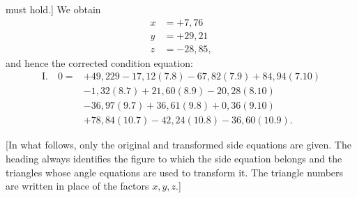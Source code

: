 must hold.] We obtain
\[
\begin{aligned}
x&=+7{,}76\\
y&=+29{,}21\\
z&=-28{,}85,
\end{aligned}
\]
and hence the corrected condition equation:
\[
\begin{aligned}
\mathrm{I.}\quad 0={}&+49{,}229-17{,}12(7.8)-67{,}82(7.9)+84{,}94(7.10)\\
&-1{,}32(8.7)+21{,}60(8.9)-20{,}28(8.10)\\
&-36{,}97(9.7)+36{,}61(9.8)+0{,}36(9.10)\\
&+78{,}84(10.7)-42{,}24(10.8)-36{,}60(10.9).
\end{aligned}
\]

[In what follows, only the original and transformed side equations
are given. The heading always identifies the figure to which the side equation
belongs and the triangles whose angle equations are used
to transform it. The triangle numbers are written in place of the factors
$x,y,z$.]
